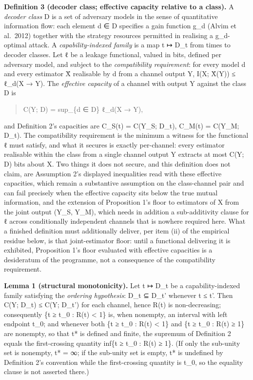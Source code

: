 \documentclass[
]{llncs}
\begin{document}
\textbf{Definition 3 (decoder class; effective capacity relative to a
class).} A \emph{decoder class} D is a set of adversary models in the
sense of quantitative information flow: each element d ∈ D specifies a
gain function g\_d (Alvim et al.~2012) together with the strategy
resources permitted in realising a g\_d-optimal attack. A
\emph{capability-indexed family} is a map t ↦ D\_t from times to decoder
classes. Let ℓ be a leakage functional, valued in bits, defined per
adversary model, and subject to the \emph{compatibility requirement}:
for every model d and every estimator X̂ realisable by d from a channel
output Y, I(X; X̂(Y)) ≤ ℓ\_d(X → Y). The \emph{effective capacity} of a
channel with output Y against the class D is

\begin{quote}
C(Y; D) = sup\_\{d ∈ D\} ℓ\_d(X → Y),
\end{quote}

and Definition 2's capacities are C\_S(t) = C(Y\_S; D\_t), C\_M(t) =
C(Y\_M; D\_t). The compatibility requirement is the minimum a witness
for the functional ℓ must satisfy, and what it secures is exactly
per-channel: every estimator realisable within the class from a single
channel output Y extracts at most C(Y; D) bits about X. Two things it
does not secure, and this definition does not claim, are Assumption 2's
displayed inequalities read with these effective capacities, which
remain a substantive assumption on the class-channel pair and can fail
precisely when the effective capacity sits below the true mutual
information, and the extension of Proposition 1's floor to estimators of
X from the joint output (Y\_S, Y\_M), which needs in addition a
sub-additivity clause for ℓ across conditionally independent channels
that is nowhere required here. What a finished definition must
additionally deliver, per item (ii) of the empirical residue below, is
that joint-estimator floor: until a functional delivering it is
exhibited, Proposition 1's floor evaluated with effective capacities is
a desideratum of the programme, not a consequence of the compatibility
requirement.

\textbf{Lemma 1 (structural monotonicity).} Let t ↦ D\_t be a
capability-indexed family satisfying the \emph{ordering hypothesis}:
D\_t ⊆ D\_t' whenever t ≤ t'. Then C(Y; D\_t) ≤ C(Y; D\_t') for each
channel, hence R(t) is non-decreasing; consequently \{t ≥ t\_0 : R(t)
\textless{} 1\} is, when nonempty, an interval with left endpoint t\_0;
and whenever both \{t ≥ t\_0 : R(t) \textless{} 1\} and \{t ≥ t\_0 :
R(t) ≥ 1\} are nonempty, so that t* is defined and finite, the supremum
of Definition 2 equals the first-crossing quantity inf\{t ≥ t\_0 : R(t)
≥ 1\}. (If only the sub-unity set is nonempty, t* = ∞; if the sub-unity
set is empty, t* is undefined by Definition 2's convention while the
first-crossing quantity is t\_0, so the equality clause is not asserted
there.)
\end{document}
